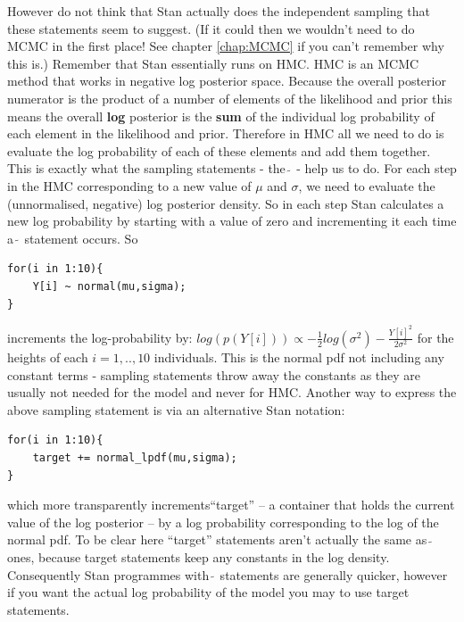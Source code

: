 \documentclass[11pt,fullpage]{book}
\begin{document}
However do not think that Stan actually does the independent sampling that these statements seem to suggest. (If it could then we wouldn't need to do MCMC in the first place! See chapter \ref{chap:MCMC} if you can't remember why this is.) Remember that Stan essentially runs on HMC. HMC is an MCMC method that works in negative log posterior space. Because the overall posterior numerator is the product of a number of elements of the likelihood and prior this means the overall \textbf{log} posterior is the \textbf{sum} of the individual log probability of each element in the likelihood and prior.  Therefore in HMC all we need to do is evaluate the log probability of each of these elements and add them together. This is exactly what the sampling statements - the $\tilde{~}$ - help us to do. For each step in the HMC corresponding to a new value of $\mu$ and $\sigma$, we need to evaluate the (unnormalised, negative) log posterior density. So in each step Stan calculates a new log probability by starting with a value of zero and incrementing it each time a $\tilde{~}$ statement occurs. So
	\begin{verbatim}
for(i in 1:10){
    Y[i] ~ normal(mu,sigma);
}
	\end{verbatim}
increments the log-probability by: $log(p(Y[i])) \propto -\frac{1}{2} log(\sigma^2)- \frac{Y[i]^2}{2\sigma^2}$ for the heights of each $i=1,..,10$ individuals. This is the normal pdf not including any constant terms - sampling statements throw away the constants as they are usually not needed for the model and never for HMC. Another way to express the above sampling statement is via an alternative Stan notation:
	\begin{verbatim}
for(i in 1:10){
    target += normal_lpdf(mu,sigma);
}
	\end{verbatim}
which more transparently increments``target'' -- a container that holds the current value of the log posterior -- by a log probability corresponding to the log of the normal pdf. To be clear here ``target'' statements aren't actually the same as $\tilde{~}$ ones, because target statements keep any constants in the log density. Consequently Stan programmes with $\tilde{~}$ statements are generally quicker, however if you want the actual log probability of the model you may to use target statements.
\end{document}
